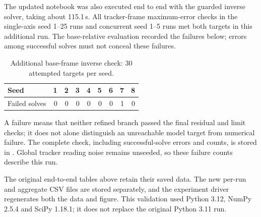\documentclass[../main.tex]{subfiles}
\begin{document}
The updated notebook was also executed end to end with the guarded inverse solver, taking about 115.1\,s. All tracker-frame maximum-error checks in the single-axis seed 1--25 runs and concurrent seed 1--5 runs met both targets in this additional run. The base-relative evaluation recorded the failures below; errors among successful solves must not conceal these failures.
\begin{table}[H]
\centering\small
\caption{Additional base-frame inverse check: 30 attempted targets per seed.}
\begin{tabular}{@{}lrrrrrrrr@{}}
\toprule
Seed & 1 & 2 & 3 & 4 & 5 & 6 & 7 & 8 \\\midrule
Failed solves & 0 & 0 & 0 & 0 & 0 & 0 & 1 & 0 \\
\bottomrule
\end{tabular}
\end{table}
A failure means that neither refined branch passed the final residual and limit checks; it does not alone distinguish an unreachable model target from numerical failure. The complete check, including successful-solve errors and counts, is stored in . Global tracker reading noise remains unseeded, so these failure counts describe this run.

The original end-to-end tables above retain their saved data. The new per-run and aggregate CSV files are stored separately, and the experiment driver regenerates both the data and figure. This validation used Python 3.12, NumPy 2.5.4 and SciPy 1.18.1; it does not replace the original Python 3.11 run.
\end{document}
